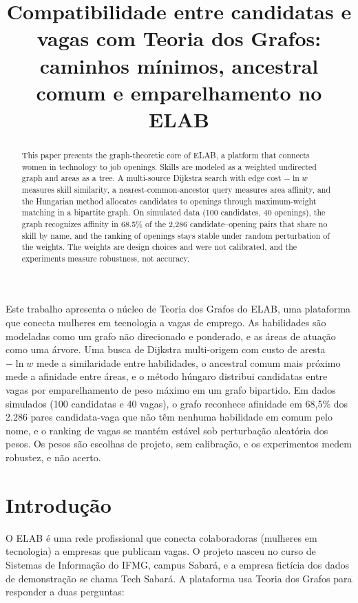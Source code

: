 \documentclass[12pt]{article}
\title{Compatibilidade entre candidatas e vagas com Teoria dos Grafos: caminhos m\'inimos, ancestral comum e emparelhamento no ELAB}
\author{}
\begin{document}
\maketitle

\begin{abstract}
This paper presents the graph-theoretic core of ELAB, a platform that connects women in technology to job openings. Skills are modeled as a weighted undirected graph and areas as a tree. A multi-source Dijkstra search with edge cost $-\ln w$ measures skill similarity, a nearest-common-ancestor query measures area affinity, and the Hungarian method allocates candidates to openings through maximum-weight matching in a bipartite graph. On simulated data (100 candidates, 40 openings), the graph recognizes affinity in 68.5\% of the 2,286 candidate--opening pairs that share no skill by name, and the ranking of openings stays stable under random perturbation of the weights. The weights are design choices and were not calibrated, and the experiments measure robustness, not accuracy.
\end{abstract}

\begin{resumo}
Este trabalho apresenta o núcleo de Teoria dos Grafos do ELAB, uma plataforma que conecta mulheres em tecnologia a vagas de emprego. As habilidades são modeladas como um grafo não direcionado e ponderado, e as áreas de atuação como uma árvore. Uma busca de Dijkstra multi-origem com custo de aresta $-\ln w$ mede a similaridade entre habilidades, o ancestral comum mais próximo mede a afinidade entre áreas, e o método húngaro distribui candidatas entre vagas por emparelhamento de peso máximo em um grafo bipartido. Em dados simulados (100 candidatas e 40 vagas), o grafo reconhece afinidade em 68,5\% dos 2.286 pares candidata-vaga que não têm nenhuma habilidade em comum pelo nome, e o ranking de vagas se mantém estável sob perturbação aleatória dos pesos. Os pesos são escolhas de projeto, sem calibração, e os experimentos medem robustez, e não acerto.
\end{resumo}

\section{Introdução}

O ELAB é uma rede profissional que conecta colaboradoras (mulheres em tecnologia) a empresas que publicam vagas. O projeto nasceu no curso de Sistemas de Informação do IFMG, campus Sabará, e a empresa fictícia dos dados de demonstração se chama Tech Sabará. A plataforma usa Teoria dos Grafos para responder a duas perguntas:
\end{document}
